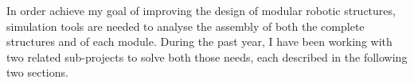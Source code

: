 
In order achieve my goal of improving the design of modular robotic structures, simulation tools are needed to analyse the assembly of both the complete structures and of each module. During the past year, I have been working with two related sub-projects to solve both those needs, each described in the following two sections.

